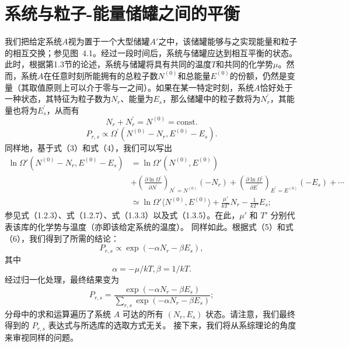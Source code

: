 \section{系统与粒子-能量储罐之间的平衡}\label{ux7cfbux7edfux4e0eux7c92ux5b50-ux80fdux91cfux50a8ux7f50ux4e4bux95f4ux7684ux5e73ux8861}
我们把给定系统\(A\)视为置于一个大型储罐\(A'\)之中，该储罐能够与之实现能量和粒子的相互交换；参见图~4.1。经过一段时间后，系统与储罐应达到相互平衡的状态。此时，根据第1.3节的论述，系统与储罐将具有共同的温度\(T\)和共同的化学势\(\mu\)。然而，系统\(A\)在任意时刻所能拥有的总粒子数\(N^{(0)}\)和总能量\(E^{(0)}\)的份额，仍然是变量（其取值原则上可以介于零与一之间）。如果在某一特定时刻，系统\(A\)恰好处于一种状态，其特征为粒子数为\(N_{r}\)、能量为\(E_{s}\)，那么储罐中的粒子数将为\(N_{r}^{\prime}\)，其能量也将为\(E_{s}^{\prime}\)，从而有
\begin{equation}\tag{4.1.1}\label{eq:4.1.1}
N _ { r } + N _ { r } ^{\prime} = N ^{( 0 )} = \mathrm { c o n s t . }
\end{equation}
\begin{equation}\tag{4.1.2}\label{eq:4.1.2}
P _ { r , s } \propto \Omega ^{\prime} ( N ^{( 0 )} - N _ { r } , E ^{( 0 )} - E _ { s } ) .
\end{equation}
同样地，基于式（3）和式（4），我们可以写出
\begin{equation}\tag{4.1.3}\label{eq:4.1.3}
\begin{aligned}\ln\Omega'(N^{(0)}-N_r,E^{(0)}-E_s)&=\ln\Omega'(N^{(0)},E^{(0)})\\&+\left(\frac{\partial\ln\Omega^{\prime}}{\partial N^{\prime}}\right)_{N^{\prime}=N^{(0)}}(-N_r)+\left(\frac{\partial\ln\Omega^{\prime}}{\partial E^{\prime}}\right)_{E^{\prime}=E^{(0)}}(-E_s)+\cdots\\&\simeq\ln\Omega'\langle N^{(0)},E^{(0)}\rangle+\frac{\mu'}{kT'}N_r-\frac{1}{kT'}E_s;\end{aligned}
\end{equation}
参见式（1.2.3）、式（1.2.7）、式（1.3.3）以及式（1.3.5）。在此，\(\mu'\) 和 \(T'\) 分别代表该库的化学势与温度（亦即该给定系统的温度）。
同样如此。根据式（5）和式（6），我们得到了所需的结论：
\begin{equation}\tag{4.1.4}\label{eq:4.1.4}
P _ { r , s } \propto \exp { ( - \alpha N _ { r } - \beta E _ { s } ) } ,
\end{equation}
其中
\begin{equation}\tag{4.1.5}\label{eq:4.1.5}
\alpha = - \mu / k T ,  \beta = 1 / k T .
\end{equation}
经过归一化处理，最终结果变为
\begin{equation}\tag{4.1.6}\label{eq:4.1.6}
P _ { r , s } = \frac { \exp { ( - \alpha N _ { r } - \beta E _ { s } ) } } { \sum _ { r , s } \exp { ( - \alpha N _ { r } - \beta E _ { s } ) } } ;
\end{equation}
分母中的求和运算遍历了系统 \(A\) 可达的所有 \((N_{r}, E_{s})\) 状态。请注意，我们最终得到的 \(P_{r,s}\) 表达式与所选库的选取方式无关。
接下来，我们将从系综理论的角度来审视同样的问题。
